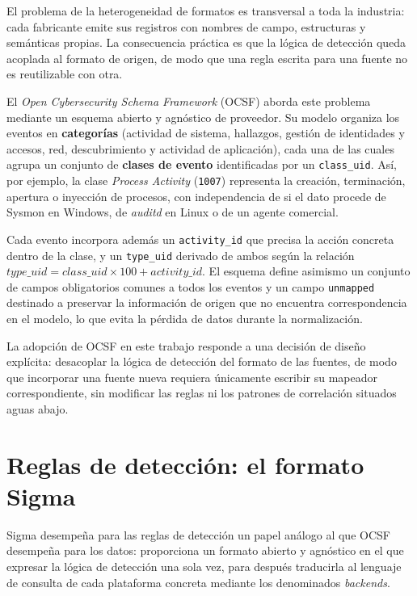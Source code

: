 El problema de la heterogeneidad de formatos es transversal a toda la industria: cada
fabricante emite sus registros con nombres de campo, estructuras y semánticas propias. La
consecuencia práctica es que la lógica de detección queda acoplada al formato de origen, de
modo que una regla escrita para una fuente no es reutilizable con otra.

El \textit{Open Cybersecurity Schema Framework} (OCSF) \cite{ocsf} aborda este problema
mediante un esquema abierto y agnóstico de proveedor. Su modelo organiza los eventos en
\textbf{categorías} (actividad de sistema, hallazgos, gestión de identidades y accesos, red,
descubrimiento y actividad de aplicación), cada una de las cuales agrupa un conjunto de
\textbf{clases de evento} identificadas por un \texttt{class\_uid}. Así, por ejemplo, la
clase \textit{Process Activity} (\texttt{1007}) representa la creación, terminación, apertura
o inyección de procesos, con independencia de si el dato procede de Sysmon en Windows, de
\textit{auditd} en Linux o de un agente comercial.

Cada evento incorpora además un \texttt{activity\_id} que precisa la acción concreta dentro
de la clase, y un \texttt{type\_uid} derivado de ambos según la relación
$type\_uid = class\_uid \times 100 + activity\_id$. El esquema define asimismo un conjunto de
campos obligatorios comunes a todos los eventos y un campo \texttt{unmapped} destinado a
preservar la información de origen que no encuentra correspondencia en el modelo, lo que
evita la pérdida de datos durante la normalización.

La adopción de OCSF en este trabajo responde a una decisión de diseño explícita: desacoplar
la lógica de detección del formato de las fuentes, de modo que incorporar una fuente nueva
requiera únicamente escribir su mapeador correspondiente, sin modificar las reglas ni los
patrones de correlación situados aguas abajo.

\section{Reglas de detección: el formato Sigma}
\label{sec:sigma}

Sigma \cite{sigma} desempeña para las reglas de detección un papel análogo al que OCSF
desempeña para los datos: proporciona un formato abierto y agnóstico en el que expresar la
lógica de detección una sola vez, para después traducirla al lenguaje de consulta de cada
plataforma concreta mediante los denominados \textit{backends}.

